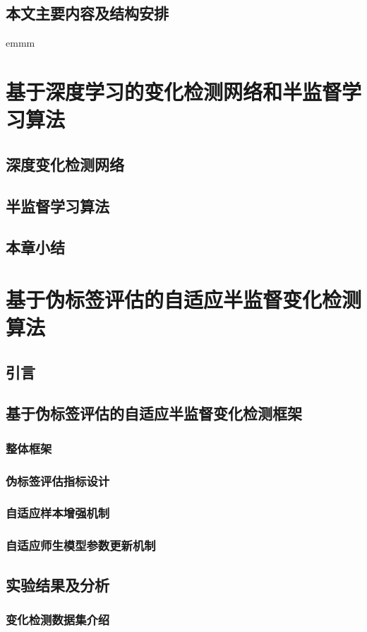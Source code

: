 \documentclass[lang=chs, degree=master, blindreview=false, adobe=false]{yanputhesis}
\begin{document}
\section{本文主要内容及结构安排}
emmm
\chapter{基于深度学习的变化检测网络和半监督学习算法}
\section{深度变化检测网络}
\section{半监督学习算法}
\section{本章小结}
\chapter{基于伪标签评估的自适应半监督变化检测算法}
\section{引言}
\section{基于伪标签评估的自适应半监督变化检测框架}
\subsection{整体框架}
\subsection{伪标签评估指标设计}
\subsection{自适应样本增强机制}
\subsection{自适应师生模型参数更新机制}
\section{实验结果及分析}
\subsection{变化检测数据集介绍}
\end{document}
